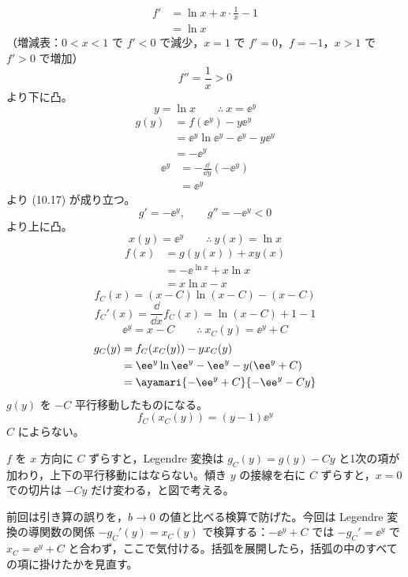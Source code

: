\begin{align*}
f'&=\ln x+x\cdot\frac{1}{x}-1\\
&=\ln x
\end{align*}
（増減表：$0<x<1$ で $f'<0$ で減少，$x=1$ で $f'=0$，$f=-1$，$x>1$ で $f'>0$ で増加）
\[ f''=\frac{1}{x}>0 \]
より下に凸。
\[ y=\ln x \qquad \therefore\ x=\ee^{y} \]
\begin{align*}
g(y)&=f(\ee^{y})-y\ee^{y}\\
&=\ee^{y}\ln\ee^{y}-\ee^{y}-y\ee^{y}\\
&=-\ee^{y}
\end{align*}
\begin{align*}
\ee^{y}&=-\frac{\dd}{\dd y}(-\ee^{y})\\
&=\ee^{y}
\end{align*}
より (10.17) が成り立つ。
\[ g'=-\ee^{y}, \qquad g''=-\ee^{y}<0 \]
より上に凸。
\[ x(y)=\ee^{y} \qquad \therefore\ y(x)=\ln x \]
\begin{align*}
f(x)&=g(y(x))+xy(x)\\
&=-\ee^{\ln x}+x\ln x\\
&=x\ln x-x
\end{align*}
\[ f_{C}(x)=(x-C)\ln(x-C)-(x-C) \]
\[ f_{C}'(x)=\frac{\dd}{\dd x}f_{C}(x)=\ln(x-C)+1-1 \]
\[ \ee^{y}=x-C \qquad \therefore\ x_{C}(y)=\ee^{y}+C \]
\begin{align*}
g_{C}(y)&=f_{C}(x_{C}(y))-yx_{C}(y)\\
&=\ee^{y}\ln\ee^{y}-\ee^{y}-y(\ee^{y}+C)\\
&=\ayamari{-\ee^{y}+C}{-\ee^{y}-Cy}
\end{align*}
$g(y)$ を $-C$ 平行移動したものになる。
\[ f_{C}(x_{C}(y))=(y-1)\ee^{y} \]
$C$ によらない。
\item $f$ を $x$ 方向に $C$ ずらすと，Legendre 変換は $g_{C}(y)=g(y)-Cy$ と1次の項が加わり，上下の平行移動にはならない。傾き $y$ の接線を右に $C$ ずらすと，$x=0$ での切片は $-Cy$ だけ変わる，と図で考える。
\item {} 前回は引き算の誤りを，$b\to0$ の値と比べる検算で防げた。今回は Legendre 変換の導関数の関係 $-g_{C}'(y)=x_{C}(y)$ で検算する：$-\ee^{y}+C$ では $-g_{C}'=\ee^{y}$ で $x_{C}=\ee^{y}+C$ と合わず，ここで気付ける。括弧を展開したら，括弧の中のすべての項に掛けたかを見直す。
